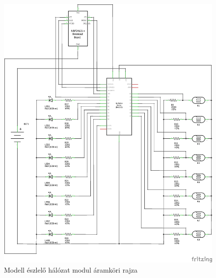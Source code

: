 \documentclass[a4paper,12pt]{article}
\begin{document}
\begin{figure}[!htp]
    \centering
	\includegraphics[width=0.8\linewidth]{images/circuit_vacancy_module.png}
    \caption[Modell észlelő hálózat modul áramköri rajza]{Modell észlelő hálózat modul áramköri rajza}
	\label{fig:circuit_vacancy_module}
\end{figure}

\newpage
\end{document}
